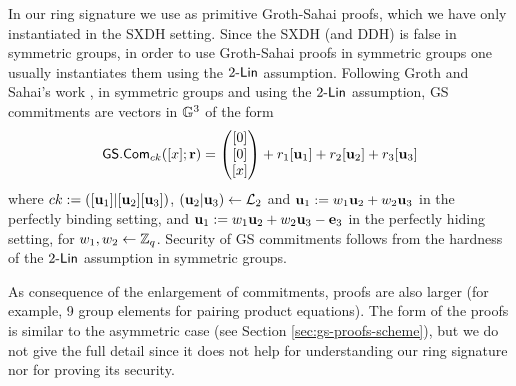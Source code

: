 In our ring signature we use as primitive Groth-Sahai proofs, which we have only instantiated in the SXDH setting. Since the SXDH (and DDH) is false in symmetric groups, in order to use Groth-Sahai proofs in symmetric groups one usually instantiates them using the $2\mbox{-}\mathsf{Lin}$ assumption. Following Groth and Sahai's work \cite{EC:GroSah08}, in symmetric groups and using the $2\mbox{-}\mathsf{Lin}$ assumption, GS commitments are vectors in $\mathbb{G}^3$ of the form
$$
{\mathsf{GS}}.\mathsf{Com}_{ck}([x];\mathbf{r})=\left(\begin{matrix}{[0]}\\{[0]}\\{[x]}\end{matrix}\right)+r_1[\mathbf{u}_1]+{r}_2[\mathbf{u}_2]+r_3[\mathbf{u}_3]
$$
where $ck:=([\mathbf{u}_1]|[\mathbf{u}_2][\mathbf{u}_3])$, $(\mathbf{u}_2|\mathbf{u}_3)\gets\mathcal{L}_2$ and $\mathbf{u}_1:=w_1\mathbf{u}_2+w_2\mathbf{u}_3$ in the perfectly binding setting, and $\mathbf{u}_1:=w_1\mathbf{u}_2+w_2\mathbf{u}_3-\mathbf{e}_3$ in the perfectly hiding setting, for $w_1,w_2\gets\mathbb{Z}_q$. Security of GS commitments follows from the hardness of the $2\mbox{-}\mathsf{Lin}$ assumption in symmetric groups.

As consequence of the enlargement of commitments, proofs are also larger (for example, 9 group elements for pairing product equations). The form of the proofs is similar  to the asymmetric case (see Section \ref{sec:gs-proofs-scheme}), but we do not give the full detail since it does not help for understanding our ring signature nor for proving its security. 


